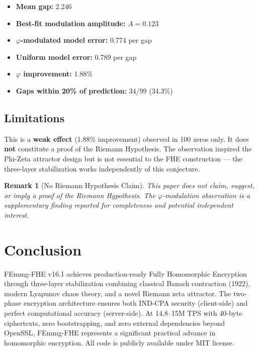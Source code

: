 \documentclass{article}
\newtheorem{remark}{Remark}[section]
\begin{document}
\begin{itemize}
    \item \textbf{Mean gap:} 2.246
    \item \textbf{Best-fit modulation amplitude:} $A = 0.123$
    \item \textbf{$\varphi$-modulated model error:} 0.774 per gap
    \item \textbf{Uniform model error:} 0.789 per gap
    \item \textbf{$\varphi$ improvement:} 1.88\%
    \item \textbf{Gaps within 20\% of prediction:} 34/99 (34.3\%)
\end{itemize}

\subsection{Limitations}

This is a \textbf{weak effect} (1.88\% improvement) observed in 100 zeros only. It does \textbf{not} constitute a proof of the Riemann Hypothesis. The observation inspired the Phi-Zeta attractor design but is not essential to the FHE construction — the three-layer stabilization works independently of this conjecture.

\begin{remark}[No Riemann Hypothesis Claim]
This paper does not claim, suggest, or imply a proof of the Riemann Hypothesis. The $\varphi$-modulation observation is a supplementary finding reported for completeness and potential independent interest.
\end{remark}

\section{Conclusion}

FEmmg-FHE v16.1 achieves production-ready Fully Homomorphic Encryption through three-layer stabilization combining classical Banach contraction (1922), modern Lyapunov chaos theory, and a novel Riemann zeta attractor. The two-phase encryption architecture ensures both IND-CPA security (client-side) and perfect computational accuracy (server-side). At 14.8--15M TPS with 40-byte ciphertexts, zero bootstrapping, and zero external dependencies beyond OpenSSL, FEmmg-FHE represents a significant practical advance in homomorphic encryption. All code is publicly available under MIT license.
\end{document}
